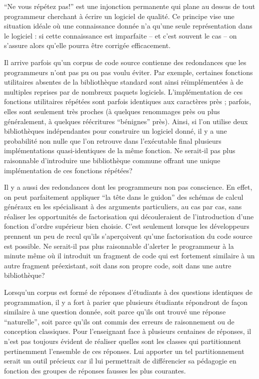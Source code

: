 
``Ne vous répétez pas!'' est une injonction permanente qui plane au
dessus de tout programmeur cherchant à écrire un logiciel de qualité.
Ce principe vise une situation idéale où une connaissance donnée n'a
qu'une seule représentation dans le logiciel : si cette connaissance
est imparfaite -- et c'est souvent le cas -- on s'assure alors qu'elle
pourra être corrigée efficacement.

Il arrive parfois qu'un corpus de code source contienne des
redondances que les programmeurs n'ont pas pu ou pas voulu éviter. Par
exemple, certaines fonctions utilitaires absentes de la bibliothèque
standard sont ainsi réimplémentées à de multiples reprises par de
nombreux paquets logiciels. L'implémentation de ces fonctions
utilitaires répétées sont parfois identiques aux caractères près ;
parfois, elles sont seulement très proches (à quelques renommages près
ou plus généralement, à quelques réécritures ``bénignes''
près). Ainsi, si l'on utilise deux bibliothèques indépendantes pour
construire un logiciel donné, il y a une probabilité non nulle que
l'on retrouve dans l'exécutable final plusieurs implémentations
quasi-identiques de la même fonction. Ne serait-il pas plus
raisonnable d'introduire une bibliothèque commune offrant une unique
implémentation de ces fonctions répétées?

Il y a aussi des redondances dont les programmeurs non pas conscience.
En effet, on peut parfaitement appliquer ``la tête dans le guidon''
des schémas de calcul généraux en les spécialisant à des arguments
particuliers, au cas par cas, sans réaliser les opportunités de
factorisation qui découleraient de l'introduction d'une fonction
d'ordre supérieur bien choisie. C'est seulement lorsque les
développeurs prennent un peu de recul qu'ils s'aperçoivent qu'une
factorisation du code source est possible. Ne serait-il pas plus
raisonnable d'alerter le programmeur à la minute même où il introduit
un fragment de code qui est fortement similaire à un autre fragment
préexistant, soit dans son propre code, soit dans une autre
bibliothèque?

Lorsqu'un corpus est formé de réponses d'étudiants à des questions
identiques de programmation, il y a fort à parier que plusieurs
étudiants répondront de façon similaire à une question donnée, soit
parce qu'ils ont trouvé une réponse ``naturelle'', soit parce qu'ils
ont commis des erreurs de raisonnement ou de conception classiques.
Pour l'enseignant face à plusieurs centaines de réponses, il n'est pas
toujours évident de réaliser quelles sont les classes
qui partitionnent pertinemment l'ensemble de ces réponses. Lui
apporter un tel partitionnement serait un outil précieux car il
lui permettrait de différencier sa pédagogie en fonction des
groupes de réponses fausses les plus courantes.

